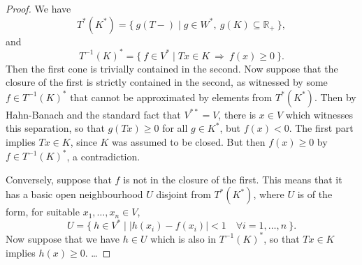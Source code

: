 \documentclass[a4paper,12pt]{scrartcl}
\numberwithin{equation}{section}
\theoremstyle{plain}
\theoremstyle{definition}
\newcommand{\R}{\mathbb{R}}
\DeclareMathOperator{\1}{\mathbbm{1}}
\DeclareMathOperator{\2}{\mathbbm{2}}
\begin{document}
\begin{proof}
We have
\[
	T^*(K^*) = \{\: g(T-) \mid g\in W^*,\: g(K)\subseteq\R_+ \:\},
\]
and
\[
	T^{-1}(K)^* = \{\: f\in V^* \mid Tx\in K \:\Rightarrow\: f(x) \geq 0 \:\}.
\]
Then the first cone is trivially contained in the second. Now suppose that the closure of the first is strictly contained in the second, as witnessed by some $f\in T^{-1}(K)^*$ that cannot be approximated by elements from $T^*(K^*)$. Then by Hahn-Banach and the standard fact that $V^{**} = V$, there is $x\in V$ which witnesses this separation, so that $g(Tx) \geq 0$ for all $g\in K^*$, but $f(x) < 0$. The first part implies $Tx\in K$, since $K$ was assumed to be closed. But then $f(x) \geq 0$ by $f\in T^{-1}(K)^*$, a contradiction.


Conversely, suppose that $f$ is not in the closure of the first. This means that it has a basic open neighbourhood $U$ disjoint from $T^*(K^*)$, where $U$ is of the form, for suitable $x_1,\ldots,x_n\in V$,
\[
	U = \{\: h\in V^* \mid |h(x_i) - f(x_i)| < 1 \quad\forall i=1,\ldots,n \:\}.
\]
Now suppose that we have $h\in U$ which is also in $T^{-1}(K)^*$, so that $Tx\in K$ implies $h(x) \geq 0$. \ldots
\end{proof}
\end{document}
